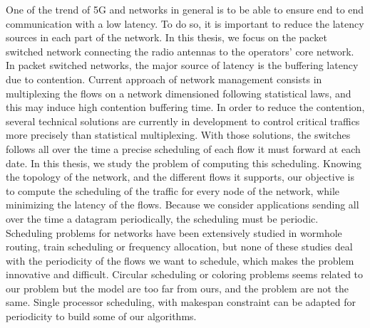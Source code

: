 One of the trend of 5G and networks in general is to be able to ensure end to end communication with a low latency. To do so, it is important to reduce the latency sources in each part of the network. In this thesis, we focus on the packet switched network connecting the radio antennas to the operators' core network. In packet switched networks, the major source of latency is the buffering latency due to contention. Current approach of network management consists in multiplexing the flows on a network dimensioned following statistical laws, and this may induce high contention buffering time. In order to reduce the contention, several technical solutions are currently in development to control critical traffics more precisely than statistical multiplexing. With those solutions, the switches follows all over the time a precise scheduling of each flow it must forward at each date. 
In this thesis, we study the problem of computing this scheduling. Knowing the topology of the network, and the different flows it supports, our objective is to compute the scheduling of the traffic for every node of the network, while minimizing the latency of the flows. Because we consider applications sending all over the time a datagram periodically, the scheduling must be periodic.
Scheduling problems for networks have been extensively studied in wormhole routing, train scheduling or frequency allocation, but none of these studies deal with the periodicity of the flows we want to schedule, which makes the problem innovative and difficult. Circular scheduling or coloring problems seems related to our problem but the model are too far from ours, and the problem are not the same. Single processor scheduling, with makespan constraint can be adapted for periodicity to build some of our algorithms.


